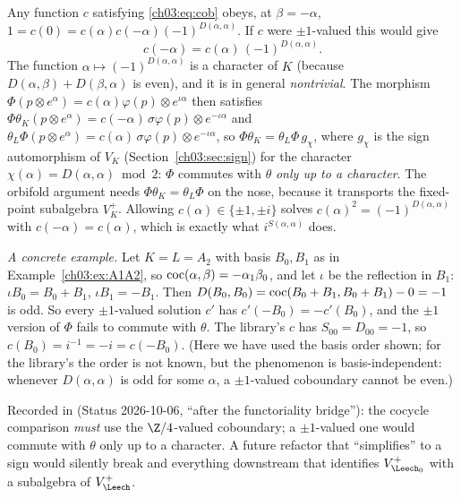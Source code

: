 \begin{remark}\label{ch03:rem:Z4}
Any function $c$ satisfying \eqref{ch03:eq:cob} obeys, at $\beta=-\alpha$,
$1=c(0)=c(\alpha)c(-\alpha)(-1)^{D(\alpha,\alpha)}$. If $c$ were $\pm1$-valued this would give
\begin{equation*}
  c(-\alpha)=c(\alpha)\,(-1)^{D(\alpha,\alpha)} .
\end{equation*}
The function $\alpha\mapsto(-1)^{D(\alpha,\alpha)}$ is a character of $K$ (because
$D(\alpha,\beta)+D(\beta,\alpha)$ is even), and it is in general \emph{nontrivial}. The morphism
$\Phi(p\otimes e^\alpha)=c(\alpha)\varphi(p)\otimes e^{\iota\alpha}$ then satisfies
$\Phi\theta_K(p\otimes e^\alpha)=c(-\alpha)\,\sigma\varphi(p)\otimes e^{-\iota\alpha}$ and
$\theta_L\Phi(p\otimes e^\alpha)=c(\alpha)\,\sigma\varphi(p)\otimes e^{-\iota\alpha}$, so
$\Phi\theta_K=\theta_L\Phi\,g_\chi$, where $g_\chi$ is the sign automorphism of $V_K$
(Section~\ref{ch03:sec:sign}) for the character $\chi(\alpha)=D(\alpha,\alpha)\bmod 2$: $\Phi$
commutes with $\theta$ \emph{only up to a character}. The orbifold argument needs
$\Phi\theta_K=\theta_L\Phi$ on the nose, because it transports the fixed-point subalgebra
$V_K^+$. Allowing $c(\alpha)\in\{\pm1,\pm i\}$ solves $c(\alpha)^2=(-1)^{D(\alpha,\alpha)}$ with
$c(-\alpha)=c(\alpha)$, which is exactly what $i^{S(\alpha,\alpha)}$ does.

\emph{A concrete example.} Let $K=L=A_2$ with basis $B_0,B_1$ as in Example~\ref{ch03:ex:A1A2},
so $\operatorname{coc}(\alpha,\beta)=-\alpha_1\beta_0$, and let $\iota$ be the reflection in $B_1$:
$\iota B_0=B_0+B_1$, $\iota B_1=-B_1$. Then $D(B_0,B_0)=\operatorname{coc}(B_0+B_1,B_0+B_1)-0=-1$ is odd.
So every $\pm1$-valued solution $c'$ has $c'(-B_0)=-c'(B_0)$, and the $\pm1$ version of $\Phi$
fails to commute with $\theta$. The library's $c$ has $S_{00}=D_{00}=-1$, so $c(B_0)=i^{-1}=-i=
c(-B_0)$. (Here we have used the basis order shown; for the library's  the order
is not known, but the phenomenon is basis-independent: whenever $D(\alpha,\alpha)$ is odd for some
$\alpha$, a $\pm1$-valued coboundary cannot be even.)
\end{remark}

\begin{warning}
Recorded in  (Status 2026-10-06, ``after the functoriality
bridge''): the cocycle comparison \emph{must} use the $\Z/4$-valued coboundary; a $\pm1$-valued
one would commute with $\theta$ only up to a character. A future refactor that ``simplifies''
 to a sign would silently break  and everything downstream
that identifies $V_{\Leech_0}^+$ with a subalgebra of $V_\Leech^+$.
\end{warning}

